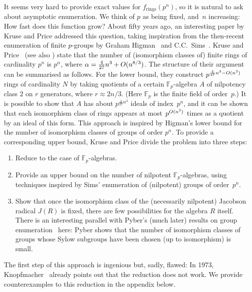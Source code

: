 \documentclass[12pt]{article}
\newcommand{\Oh}{\mathnormal{O}}
\newcommand{\fr}{f_\mathrm{rings}}
\begin{document}
It seems very hard to provide exact values for $\fr(p^{n})$, so it is natural to ask about asymptotic enumeration. We think of $p$ as being fixed, and~$n$ increasing: How fast does this function grow? About fifty years ago, an interesting paper by Kruse and Price \cite{K & P} addressed this question, taking inspiration from the then-recent enumeration of finite $p$-groups by Graham Higman~\cite{Higman} and C.C.~Sims~\cite{Sims}. Kruse and Price~\cite[Corollary~5.9]{K & P} (see also \cite[Chapter~V]{K & P book}) state that the number of (isomorphism classes of) finite rings of cardinality $p^{n}$ is $p^{\alpha}$, where $\alpha = \frac{4}{27}n^{3} + \Oh(n^{8/3})$. The structure of their argument can be summarised as follows. For the lower bound, they construct $p^{\frac{4}{27}n^{3} -\Oh(n^2)}$ rings of cardinality $N$ by taking quotients of a certain $\mathbb{F}_p$-algebra $A$ of nilpotency class $2$ on $r$ generators, where $r\approx 2n/3$. (Here $\mathbb{F}_p$ is the finite field of order~$p$.) It is possible to show that $A$ has about $p^{\frac{4}{27}n^3}$ ideals of index~$p^n$, and it can be shown that each isomorphism class of rings appears at most~$p^{\Oh(n^2)}$ times as a quotient by an ideal of this form. This approach is inspired by Higman's lower bound for the number of isomorphism classes of groups of order $p^n$. To provide a corresponding upper bound, Kruse and Price divide the problem into three steps:
\begin{enumerate}
\item Reduce to the case of $\mathbb{F}_p$-algebras.
\item Provide an upper bound on the number of nilpotent $\mathbb{F}_p$-algebras, using techniques inspired by Sims' enumeration of (nilpotent) groups of order~$p^n$.
\item Show that once the isomorphism class of the (necessarily nilpotent) Jacobson radical $J(R)$ is fixed, there are few possibilities for the algebra $R$ itself. There is an interesting parallel with Pyber's (much later) results on group enumeration~\cite{Pyber} here: Pyber shows that the number of isomorphism classes of groups whose Sylow subgroups have been chosen (up to isomorphism) is small. 
\end{enumerate}

The first step of this approach is ingenious but, sadly, flawed: In 1973, Knopfmacher~\cite[Page~169]{Knopfmacher} already points out that the reduction does not work. We provide counterexamples to this reduction in the appendix below.
\end{document}
